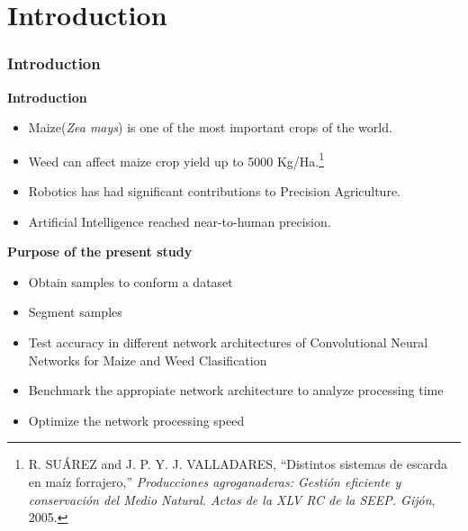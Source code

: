 \documentclass[10pt,a4paper]{beamer}
\begin{document}
\section{Introduction}
\begin{frame}
\frametitle{Introduction}
\textbf{Introduction}
\begin{itemize}
\item Maize(\textit{Zea mays}) is one of the most important crops of the world.
\item Weed can affect maize crop yield up to 5000 Kg/Ha.\footnote{ R. SU\'AREZ and J. P. Y. J. VALLADARES, “Distintos sistemas de escarda en ma\'iz forrajero,” \textit{Producciones agroganaderas: Gesti\'on eficiente
y conservaci\'on del Medio Natural. Actas de la XLV RC de la SEEP. Gij\'on}, 2005.} %
\item Robotics has had significant contributions to Precision Agriculture.%
\item Artificial Intelligence reached near-to-human precision.%
\end{itemize}
\textbf{Purpose of the present study}
\begin{itemize}
\item Obtain samples to conform a dataset%
\item Segment samples%
\item Test accuracy in different network architectures of Convolutional Neural Networks for Maize and Weed Clasification %
\item Benchmark the appropiate network architecture to analyze processing time %
\item Optimize the network processing speed %
\end{itemize}
\end{frame}
\end{document}
